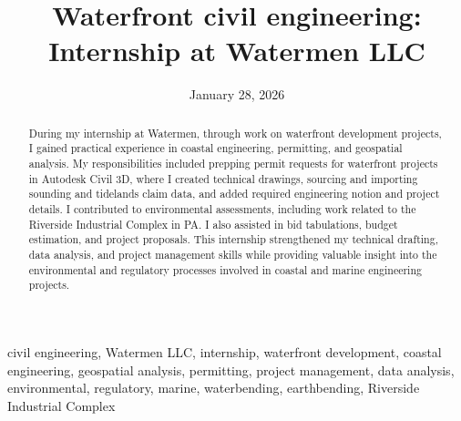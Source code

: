 \documentclass[12pt,conference,onecolumn]{IEEEtran}
\title{Waterfront civil engineering: Internship at Watermen LLC}
\author{%
\IEEEauthorblockN{Edmund Lee}\IEEEauthorblockA{Science \& Engineering\\Manalapan High School\\Englishtown, NJ\\\href{mailto:426elee@frhsd.com}{426elee@frhsd.com}}}
\date{January 28, 2026}
\newcommand{\keywords}{civil engineering, Watermen LLC, internship, waterfront development, coastal engineering, geospatial analysis, permitting, project management, data analysis, environmental, regulatory, marine, waterbending, earthbending, Riverside Industrial Complex}
\begin{document}
\maketitle 

\begin{abstract}
During my internship at Watermen, through work on waterfront development projects, I gained practical experience in coastal engineering, permitting, and geospatial analysis. My responsibilities included prepping permit requests for waterfront projects in Autodesk Civil 3D, where I created technical drawings, sourcing and importing sounding and tidelands claim data, and added required engineering notion and project details. I contributed to environmental assessments, including work related to the Riverside Industrial Complex in PA. I also assisted in bid tabulations, budget estimation, and project proposals. This internship strengthened my technical drafting, data analysis, and project management skills while providing valuable insight into the environmental and regulatory processes involved in coastal and marine engineering projects.
\end{abstract}

\begin{IEEEkeywords}
\keywords
\end{IEEEkeywords}
\end{document}
